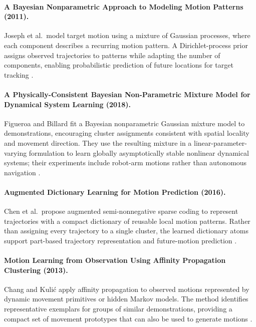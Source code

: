 \documentclass[a4paper]{article}
\begin{document}
   \paragraph{A Bayesian Nonparametric Approach to Modeling Motion Patterns (2011).}
   Joseph et al.\ model target motion using a mixture of Gaussian processes, where each component describes a recurring motion pattern. A Dirichlet-process prior assigns observed trajectories to patterns while adapting the number of components, enabling probabilistic prediction of future locations for target tracking \cite{joseph-2011-a-bayesian-nonparametric-approach-to-modeling-motion-patterns}.

   \paragraph{A Physically-Consistent Bayesian Non-Parametric Mixture Model for Dynamical System Learning (2018).}
   Figueroa and Billard fit a Bayesian nonparametric Gaussian mixture model to demonstrations, encouraging cluster assignments consistent with spatial locality and movement direction. They use the resulting mixture in a linear-parameter-varying formulation to learn globally asymptotically stable nonlinear dynamical systems; their experiments include robot-arm motions rather than autonomous navigation \cite{figueroa-2018-a-physically-consistent-bayesian-non-parametric-mixture-model}.

   \paragraph{Augmented Dictionary Learning for Motion Prediction (2016).}
   Chen et al.\ propose augmented semi-nonnegative sparse coding to represent trajectories with a compact dictionary of reusable local motion patterns. Rather than assigning every trajectory to a single cluster, the learned dictionary atoms support part-based trajectory representation and future-motion prediction \cite{chen-2016-augmented-dictionary-learning-for-motion-prediction}.

   \paragraph{Motion Learning from Observation Using Affinity Propagation Clustering (2013).}
   Chang and Kuli\'c apply affinity propagation to observed motions represented by dynamic movement primitives or hidden Markov models. The method identifies representative exemplars for groups of similar demonstrations, providing a compact set of movement prototypes that can also be used to generate motions \cite{chang-2013-motion-learning-from-observation-using-affinity-propagation-clustering}.
\end{document}
